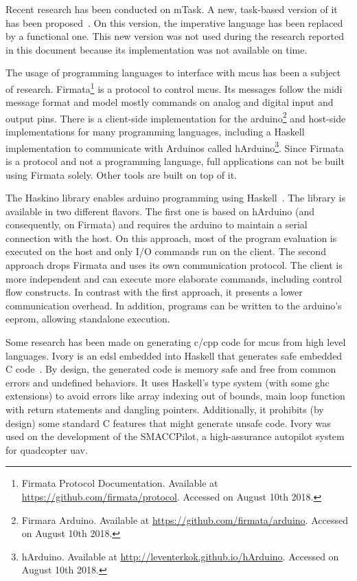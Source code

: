Recent research has been conducted on \gls{mTask}. A new, task-based version of it has been proposed~\cite{micro}. On this version, the imperative language has been replaced by a functional one. This new version was not used during the research reported in this document because its implementation was not available on time.

The usage of programming languages to interface with \glspl{mcu} has been a subject of research. Firmata\footnote{Firmata Protocol Documentation. Available at \url{https://github.com/firmata/protocol}. Accessed on August 10th 2018.} is a protocol to control \glspl{mcu}. Its messages follow the \acs{midi} message format and model mostly commands on analog and digital input and output pins. There is a client-side implementation for the \gls{arduino}\footnote{Firmara Arduino. Available at \url{https://github.com/firmata/arduino}. Accessed on August 10th 2018.} and host-side implementations for many programming languages, including a Haskell implementation to communicate with Arduinos called hArduino\footnote{hArduino. Available at \url{http://leventerkok.github.io/hArduino}. Accessed on August 10th 2018.}. Since Firmata is a protocol and not a programming language, full applications can not be built using Firmata solely. Other tools are built on top of it.

The Haskino library enables \gls{arduino} programming using Haskell~\cite{haskino}. The library is available in two different flavors. The first one is based on hArduino (and consequently, on Firmata) and requires the \gls{arduino} to maintain a serial connection with the host. On this approach, most of the program evaluation is executed on the host and only I/O commands run on the client. The second approach drops Firmata and uses its own communication protocol. The client is more independent and can execute more elaborate commands, including control flow constructs. In contrast with the first approach, it presents a lower communication overhead. In addition, programs can be written to the \gls{arduino}'s \acs{eeprom}, allowing standalone execution.

Some research has been made on generating \gls{c}/\gls{cpp} code for \glspl{mcu} from high level languages. Ivory is an \ac{edsl} embedded into Haskell that generates safe embedded C code~\cite{ivory1,ivory2}. By design, the generated code is memory safe and free from common errors and undefined behaviors. It uses Haskell's type system (with some \acs{ghc} extensions) to avoid errors like array indexing out of bounds, main loop function with return statements and dangling pointers. Additionally, it prohibits (by design) some standard C features that might generate unsafe code. Ivory was used on the development of the SMACCPilot, a high-assurance autopilot system for quadcopter \ac{uav}.

